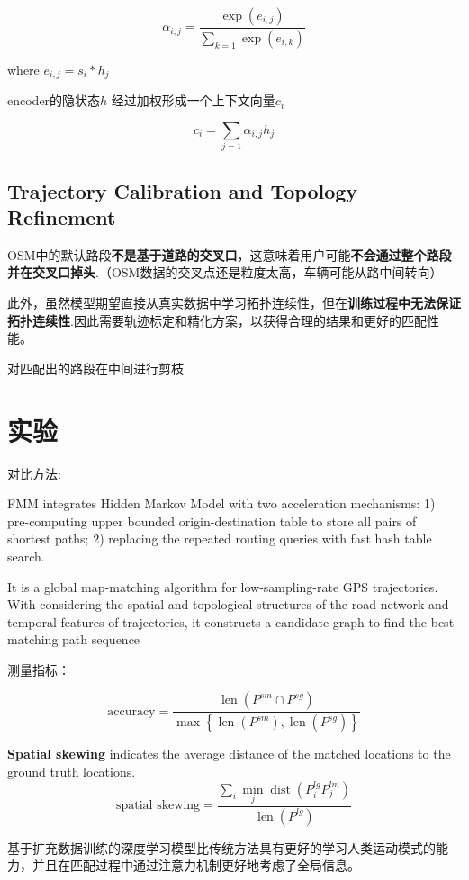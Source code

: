 $$ \alpha_{i, j}=\frac{\exp \left(e_{i, j}\right)}{\sum_{k=1} \exp \left(e_{i, k}\right)} $$

where $ e_{i, j}=s_{i} * h_{j} $

encoder的隐状态$h$ 经过加权形成一个上下文向量$c_i$

$$ c_{i}=\sum_{j=1} \alpha_{i, j} h_{j} $$

\subsection{Trajectory Calibration and Topology Refinement}

OSM中的默认路段\textbf{不是基于道路的交叉口}，这意味着用户可能\textbf{不会通过整个路段并在交叉口掉头}.（OSM数据的交叉点还是粒度太高，车辆可能从路中间转向）

此外，虽然模型期望直接从真实数据中学习拓扑连续性，但在\textbf{训练过程中无法保证拓扑连续性}.因此需要轨迹标定和精化方案，以获得合理的结果和更好的匹配性能。

对匹配出的路段在中间进行剪枝

\section{实验}

对比方法:

\begin{definition}
    \cite{Yang2018} FMM integrates Hidden
Markov Model with two acceleration mechanisms: 1)
pre-computing upper bounded origin-destination table to
store all pairs of shortest paths; 2) replacing the repeated
routing queries with fast hash table search.
\end{definition}

\begin{definition}[ST Matching]
    \cite{Lou2009} It is a global map-matching algorithm
    for low-sampling-rate GPS trajectories. With considering
    the spatial and topological structures of the road network
    and temporal features of trajectories, it constructs a candidate
    graph to find the best matching path sequence
\end{definition}

测量指标：


 $$\text{accuracy} =\frac{\operatorname{len}\left(P^{s m} \cap P^{s g}\right)}{\max \left\{\operatorname{len}\left(P^{s m}\right), \operatorname{len}\left(P^{s g}\right)\right\}} $$

 \textbf{Spatial skewing} indicates
the average distance of the matched locations to the ground
truth locations.
  $$\text{spatial skewing} =\frac{\sum_{i} \min _{j} \operatorname{dist}\left(P_{i}^{l g} P_{j}^{l m}\right)}{\operatorname{len}\left(P^{l g}\right)} $$

基于扩充数据训练的深度学习模型比传统方法具有更好的学习人类运动模式的能力，并且在匹配过程中通过注意力机制更好地考虑了全局信息。